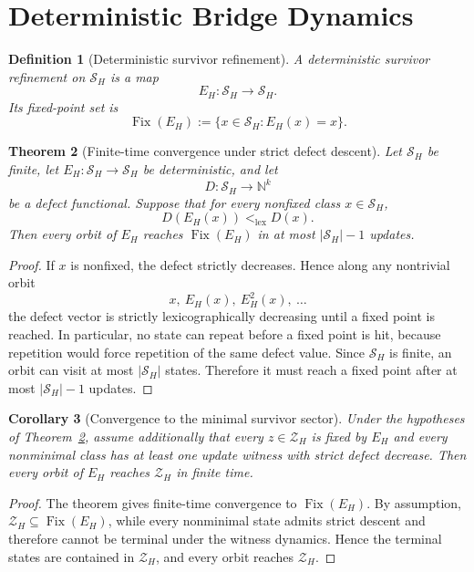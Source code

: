 \documentclass[11pt]{article}
\newtheorem{theorem}{Theorem}[section]
\newtheorem{corollary}[theorem]{Corollary}
\newtheorem{definition}[theorem]{Definition}
\theoremstyle{remark}
\theoremstyle{plain}
\begin{document}
\section{Deterministic Bridge Dynamics}
\label{sec:deterministic}

\begin{definition}[Deterministic survivor refinement]
A deterministic survivor refinement on \(\mathcal S_H\) is a map
\[
E_H:\mathcal S_H\to \mathcal S_H.
\]
Its fixed-point set is
\[
\operatorname{Fix}(E_H):=\{x\in\mathcal S_H:E_H(x)=x\}.
\]
\end{definition}

\begin{theorem}[Finite-time convergence under strict defect descent]
\label{thm:finite-time}
Let \(\mathcal S_H\) be finite, let \(E_H:\mathcal S_H\to\mathcal S_H\) be deterministic, and let
\[
D:\mathcal S_H\to\mathbb N^k
\]
be a defect functional. Suppose that for every nonfixed class \(x\in\mathcal S_H\),
\[
D(E_H(x))<_{\mathrm{lex}} D(x).
\]
Then every orbit of \(E_H\) reaches \(\operatorname{Fix}(E_H)\) in at most \(|\mathcal S_H|-1\) updates.
\end{theorem}

\begin{proof}
If \(x\) is nonfixed, the defect strictly decreases. Hence along any nontrivial orbit
\[
x,\ E_H(x),\ E_H^2(x),\ \dots
\]
the defect vector is strictly lexicographically decreasing until a fixed point is reached. In particular, no state can repeat before a fixed point is hit, because repetition would force repetition of the same defect value. Since \(\mathcal S_H\) is finite, an orbit can visit at most \(|\mathcal S_H|\) states. Therefore it must reach a fixed point after at most \(|\mathcal S_H|-1\) updates.
\end{proof}

\begin{corollary}[Convergence to the minimal survivor sector]
\label{cor:minimalsector}
Under the hypotheses of Theorem~\ref{thm:finite-time}, assume additionally that every \(z\in\mathcal Z_H\) is fixed by \(E_H\) and every nonminimal class has at least one update witness with strict defect decrease. Then every orbit of \(E_H\) reaches \(\mathcal Z_H\) in finite time.
\end{corollary}

\begin{proof}
The theorem gives finite-time convergence to \(\operatorname{Fix}(E_H)\). By assumption, \(\mathcal Z_H\subseteq \operatorname{Fix}(E_H)\), while every nonminimal state admits strict descent and therefore cannot be terminal under the witness dynamics. Hence the terminal states are contained in \(\mathcal Z_H\), and every orbit reaches \(\mathcal Z_H\).
\end{proof}
\end{document}
